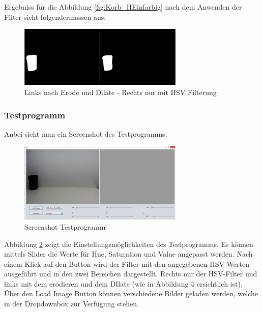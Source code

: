 Ergebniss für die Abbildung \ref{fig:Korb_HEinfarbig} nach dem Anwenden der 
Filter sieht folgendermassen aus:

\begin{figure}[h!]
    \centering
    \includegraphics[width=0.7\textwidth]{fig/Korberkennung1.png}
    \caption{Links nach Erode und Dilate - Rechts nur mit HSV Filterung}
    \label{fig:Korb_Erkennung}
\end{figure}

\subsubsection{Testprogramm}
Anbei sieht man ein Screenshot des Testprogramms:
\begin{figure}[h!]
    \centering
    \includegraphics[width=0.7\textwidth]{fig/Testprogramm.png}
    \caption{Screenshot Testprogramm}
    \label{fig:Korb_Testprogramm}
\end{figure}

Abbildung \ref{fig:Korb_Testprogramm} zeigt die Einstellungsmöglichkeiten des 
Testprogramms. Es können mittels Slider die Werte für Hue, Saturation und 
Value angepasst werden. Nach einem Klick auf den Button wird der Filter mit 
den angegebenen HSV-Werten ausgeführt und in den zwei Bereichen dargestellt. 
Rechts nur der HSV-Filter und links mit dem erodieren und dem DIlate (wie in 
Abbildung 4 ersichtlich ist). \\
Über den Load Image Button können verschiedene Bilder geladen werden, welche 
in der Dropdownbox zur Verfügung stehen.
